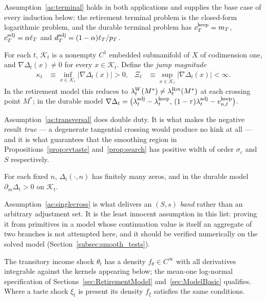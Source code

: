 Assumption~\ref{as:terminal} holds in both applications and supplies the base case of
every induction below: the retirement terminal problem is the closed-form logarithmic
problem, and the durable terminal problem has $c_T^{\mathrm{keep}}=m_T$, $c_T^{\mathrm{adj}}=\alpha\ell_T$
and $d_T^{\mathrm{adj}}=(1-\alpha)\ell_T/p_T$.

\begin{assumption}[Transversality]
\label{as:transversal}
For each $t$, $\mathcal{K}_t$ is a nonempty $C^{1}$ embedded submanifold of $X$ of
codimension one, and $\nabla\Delta_t(x)\neq 0$ for every $x\in\mathcal{K}_t$. Define
the \emph{jump magnitude}
\begin{align}
\kappa_t &\equiv \inf_{x\in\mathcal{K}_t}\big|\nabla\Delta_t(x)\big| > 0,
&
\Xi_t &\equiv \sup_{x\in\mathcal{K}_t}\big|\nabla\Delta_t(x)\big| < \infty .
\end{align}
In the retirement model this reduces to $\lambda_t^{W}(M^{\ast})\neq\lambda_t^{\mathrm{Ret}}(M^{\ast})$
at each crossing point $M^{\ast}$; in the durable model
$\nabla\Delta_t=\big(\lambda_t^{\mathrm{adj}}-\lambda_t^{\mathrm{keep}},\,(1-\tau)\lambda_t^{\mathrm{adj}}-v_{n,t}^{\mathrm{keep}}\big)$.
\end{assumption}

Assumption~\ref{as:transversal} does double duty. It is what makes the negative result
\emph{true} --- a degenerate tangential crossing would produce no kink at all --- and
it is what guarantees that the smoothing region in
Propositions~\ref{prop:evtaste} and~\ref{prop:search} has positive width of order
$\sigma_\varepsilon$ and $S$ respectively.

\begin{assumption}
\label{as:singlecross}
For each fixed $n$, $\Delta_t(\cdot,n)$ has finitely many zeros, and in the durable
model $\partial_m\Delta_t>0$ on $\mathcal{K}_t$.
\end{assumption}

Assumption~\ref{as:singlecross} is what delivers an $(S,s)$ \emph{band} rather than an
arbitrary adjustment set. It is the least innocent assumption in this list: proving it
from primitives in a model whose continuation value is itself an aggregate of two
branches is not attempted here, and it should be verified numerically on the solved
model (Section~\ref{subsec:smooth_tests}).

\begin{assumption}
\label{as:shocks}
The transitory income shock $\theta_{t}$ has a density $f_\theta\in C^{\infty}$ with
all derivatives integrable against the kernels appearing below; the mean-one
log-normal specification of Sections~\ref{sec:RetirementModel}
and~\ref{sec:ModelBasic} qualifies. Where a taste shock $\xi_t$ is present its
density $f_\xi$ satisfies the same conditions.
\end{assumption}

